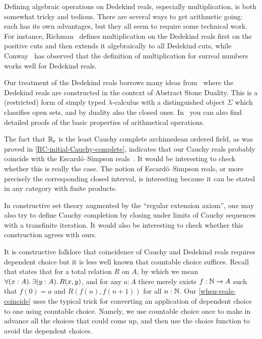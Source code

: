 \sectionNotes

Defining algebraic operations on Dedekind reals, especially multiplication, is both somewhat tricky and tedious.
There are several ways to get arithmetic going: each has its own advantages, but they all seem to require some technical work.
For instance, Richman~\cite{Richman:reals} defines multiplication on the Dedekind reals first on the positive cuts and then extends it algebraically to all Dedekind cuts, while Conway~\cite{conway:onag} has observed that the definition of multiplication for surreal numbers works well for Dedekind reals.

Our treatment of the Dedekind reals borrows many ideas from~\cite{BauerTaylor09} where the Dedekind reals are constructed in the context of Abstract Stone Duality.
%
This is a (restricted) form of simply typed $\lambda$-calculus with a distinguished object $\Sigma$ which classifies open sets, and by duality also the closed ones. In~\cite{BauerTaylor09} you can also find detailed proofs of the basic properties of arithmetical operations.

The fact that $\mathbb{R}_\mathsf{c}$ is the least Cauchy complete archimedean ordered field, as was proved in \cref{RC-initial-Cauchy-complete}, indicates that our Cauchy reals probably coincide with the Escard{\'o}--Simpson reals~\cite{EscardoSimpson:01}.
%
It would be interesting to check whether this is really the case. The notion of Escard{\'o}--Simpson reals, or more precisely the corresponding closed interval, is interesting because it can be stated in any category with finite products.

In constructive set theory augmented by the ``regular extension axiom'', one may also try to define Cauchy completion by closing under limits of Cauchy sequences with a transfinite iteration.
It would also be interesting to check whether this construction agrees with ours.

It is constructive folklore that coincidence of Cauchy and Dedekind reals requires dependent choice but it is less well known that countable choice suffices. Recall that 
%
%
%
states that for a total relation $R$ on $A$, by which we mean $\fall{x : A} \exis{y : A} R(x,y)$, and for any $a : A$ there merely exists $f : \mathbb{N} \to A$ such that $f(0) = a$ and $R(f(n), f(n+1))$ for all $n : \mathbb{N}$. Our \cref{when-reals-coincide} uses the typical trick for converting an application of dependent choice to one using countable choice. Namely, we use countable choice once to make in advance all the choices that could come up, and then use the choice function to avoid the dependent choices.

